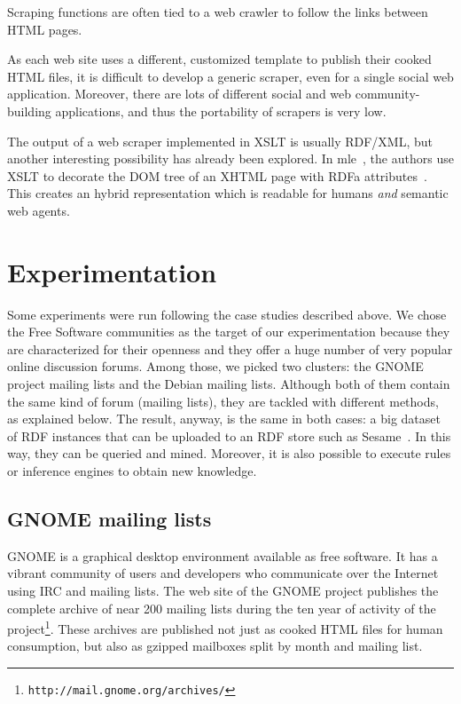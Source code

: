 \documentclass{../templates/www2008-submission}
\begin{document}
Scraping functions are often tied to a web crawler to follow the
links between HTML pages.

As each web site uses a different, customized template to
publish their cooked HTML files, it is
difficult to develop a generic scraper, even for a single social
web application. Moreover, there are lots of different social and
web community-building applications, and thus the portability of scrapers
is very low.

The output of a web scraper implemented in XSLT is usually RDF/XML, but
another interesting possibility has already been explored. In
mle~\cite{Hausenblas2007}, the authors use XSLT to decorate the
DOM tree of an XHTML page with RDFa attributes~\cite{Birbeck2006}.
This creates an hybrid representation which is readable for
humans \emph{and} semantic web agents.


\section{Experimentation}\label{sec:experimentation}

Some experiments were run following the case studies described above.
We chose the Free Software communities as the target of our
experimentation because they are characterized for their openness and
they offer a huge number of very popular online discussion forums.
Among those, we picked two clusters: the GNOME project mailing lists and
the Debian mailing lists. Although both of them contain the same
kind of forum (mailing lists), they are tackled with different methods,
as explained below. The result, anyway, is the same in both cases:
a big dataset of RDF instances that can be uploaded to an RDF
store such as Sesame~\cite{Broekstra2002}. In this way, they can be
queried and mined. Moreover, it is also possible to execute rules or
inference engines to obtain new knowledge.

\subsection{GNOME mailing lists}\label{sec:gnome}

GNOME is a graphical desktop environment available as free
software. It has a vibrant community of users and developers
who communicate over the Internet using IRC and mailing lists.
The web site of the GNOME project publishes the complete archive
of near 200 mailing lists during the ten year of activity of
the project\footnote{\texttt{http://mail.gnome.org/archives/}}.
These archives are published not just as cooked HTML files for
human consumption, but also as gzipped mailboxes split by
month and mailing list.
\end{document}
